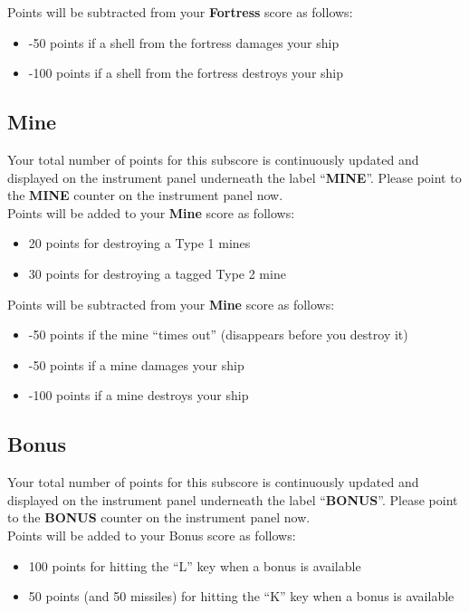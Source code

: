 \documentclass[letterpaper,12pt]{article}
\begin{document}
\noindent
Points will be subtracted from your \textbf{Fortress} score as follows:
\begin{itemize}
\item -50 points if a shell from the fortress damages your ship
\item -100 points if a shell from the fortress destroys your ship
\end{itemize}

\subsection{Mine}

Your total number of points for this subscore is continuously updated and displayed on
the instrument panel underneath the label ``\textbf{MINE}''. Please point to the \textbf{MINE}
counter on the instrument panel now.\\

\noindent
Points will be added to your \textbf{Mine} score as follows:
\begin{itemize}
\item 20 points for destroying a Type 1 mines
\item 30 points for destroying a tagged Type 2 mine
\end{itemize}

\noindent
Points will be subtracted from your \textbf{Mine} score as follows:
\begin{itemize}
\item -50 points if the mine ``times out'' (disappears before you destroy it)
\item -50 points if a mine damages your ship
\item -100 points if a mine destroys your ship
\end{itemize}

\subsection{Bonus}

Your total number of points for this subscore is continuously updated and displayed on
the instrument panel underneath the label ``\textbf{BONUS}''. Please point to the \textbf{BONUS}
counter on the instrument panel now.\\

\noindent
Points will be added to your Bonus score as follows:
\begin{itemize}
\item 100 points for hitting the “L” key when a bonus is available
\item 50 points (and 50 missiles) for hitting the “K” key when a bonus is available
\end{itemize}
\end{document}
